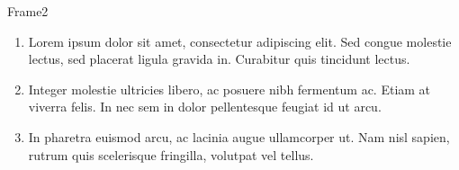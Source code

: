 \documentclass[notes, red, mathserif]{beamer}
\newcounter{saveenumi}
\newcommand{\conti}{\setcounter{enumi}{\value{saveenumi}}}
\begin{document}
\begin{frame}{Frame2}
	\begin{enumerate}[<+->]
		\conti
		\item Lorem ipsum dolor sit amet, consectetur adipiscing elit. Sed congue molestie lectus, sed placerat ligula gravida in. Curabitur quis tincidunt lectus.
		\item Integer molestie ultricies libero, ac posuere nibh fermentum ac. Etiam at viverra felis. In nec sem in dolor pellentesque feugiat id ut arcu.
		\item In pharetra euismod arcu, ac lacinia augue ullamcorper ut. Nam nisl sapien, rutrum quis scelerisque fringilla, volutpat vel tellus.
	\end{enumerate}
\end{frame}
\end{document}
